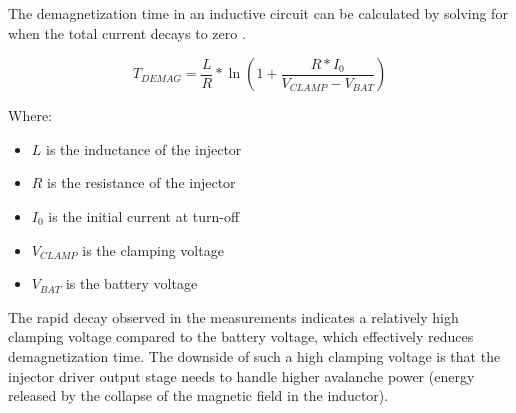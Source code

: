     The demagnetization time in an inductive circuit can be calculated by solving for when the total current decays to zero \autocite{texasinstrumentsHowDriveResistive2021,kerscherFasterSwitchingLarge2022}. 

    \begin{equation}
        T_{DEMAG} = \frac{L}{R} * \ln(1 + \frac{R * I_0}{V_{CLAMP} - V_{BAT}})
    \end{equation}

    Where:
    \begin{itemize}
        \item $L$ is the inductance of the injector
        \item $R$ is the resistance of the injector
        \item $I_0$ is the initial current at turn-off
        \item $V_{CLAMP}$ is the clamping voltage
        \item $V_{BAT}$ is the battery voltage
    \end{itemize}

    The rapid decay observed in the measurements indicates a relatively high clamping voltage compared to the battery voltage, which effectively reduces demagnetization time. The downside of such a high clamping voltage is that the injector driver output stage needs to handle higher \gls{avalanche} power (energy released by the collapse of the magnetic field in the inductor).



